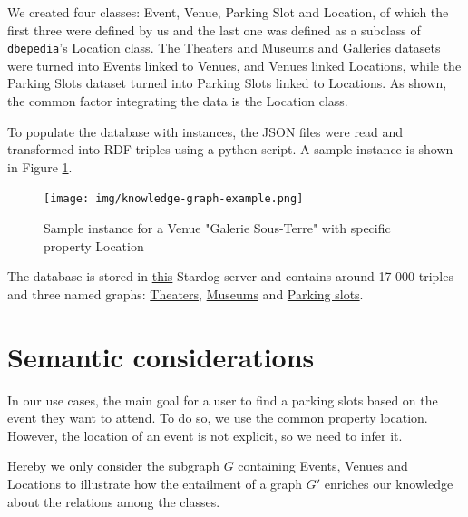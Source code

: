 \documentclass[runningheads,a4paper]{../../StyleFiles/llncs}
\begin{document}
We created four classes: Event, Venue, Parking Slot and Location, of which the first three were defined by us and the last one was defined as a subclass of \texttt{dbepedia}'s Location class. The Theaters and Museums and Galleries datasets were turned into Events linked to Venues, and Venues linked Locations, while the Parking Slots dataset turned into Parking Slots linked to Locations. As shown, the common factor integrating the data is the Location class. 

To populate the database with instances, the JSON files were read and transformed into RDF triples using a python script. A sample instance is shown in Figure \ref{fig:instance}. 

\begin{figure}[h]
	\centering
	\texttt{[image: img/knowledge-graph-example.png]}
	\caption{Sample instance for a Venue "Galerie Sous-Terre" with specific property Location}
	\label{fig:instance}
\end{figure}

The database is stored in \href{http://stardog.krw.d2s.labs.vu.nl/#/databases/group6}{this} Stardog server and contains around 17 000 triples and three named graphs: \href{http://data.krw.d2s.labs.vu.nl/doc/group6/findaslot/resource/findaslot/theaters}{Theaters}, \href{http://data.krw.d2s.labs.vu.nl/doc/group6/findaslot/resource/findaslot/museums}{Museums} and \href{http://data.krw.d2s.labs.vu.nl/doc/group6/findaslot/resource/findaslot/parking-slots}{Parking slots}.


\section{Semantic considerations}
In our use cases, the main goal for a user to find a parking slots based on the event they want to attend. To do so, we use the common property location. However, the location of an event is not explicit, so we need to infer it.

Hereby we only consider the subgraph $G$ containing Events, Venues and Locations to illustrate how the entailment of a graph $G'$ enriches our knowledge about the relations among the classes. 
\end{document}
